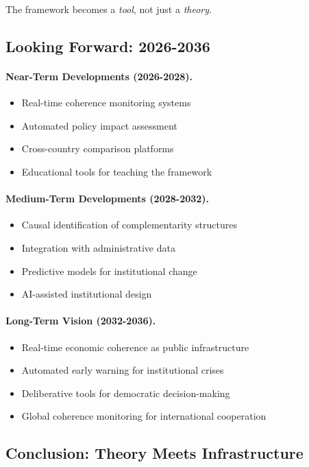 \documentclass[12pt,a4paper]{article}
\begin{document}
The framework becomes a \emph{tool}, not just a \emph{theory}.

\subsection{Looking Forward: 2026-2036}

\paragraph{Near-Term Developments (2026-2028).}
\begin{itemize}
  \item Real-time coherence monitoring systems
  \item Automated policy impact assessment
  \item Cross-country comparison platforms
  \item Educational tools for teaching the framework
\end{itemize}

\paragraph{Medium-Term Developments (2028-2032).}
\begin{itemize}
  \item Causal identification of complementarity structures
  \item Integration with administrative data
  \item Predictive models for institutional change
  \item AI-assisted institutional design
\end{itemize}

\paragraph{Long-Term Vision (2032-2036).}
\begin{itemize}
  \item Real-time economic coherence as public infrastructure
  \item Automated early warning for institutional crises
  \item Deliberative tools for democratic decision-making
  \item Global coherence monitoring for international cooperation
\end{itemize}

\subsection{Conclusion: Theory Meets Infrastructure}
\end{document}
